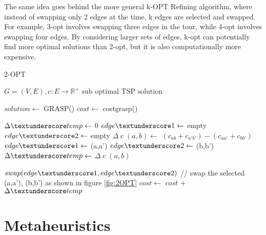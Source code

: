 The same idea goes behind the more general k-OPT Refining algorithm, where instead of swapping only 2 edges at the time, k edges are selected and swapped. For example, 3-opt involves swapping three edges in the tour, while 4-opt involves swapping four edges. By considering larger sets of edges, k-opt can potentially find more optimal solutions than 2-opt, but it is also computationally more expensive.
\begin{algorithm}[h!]
    \caption{2-OPT}\label{algo:2-OPT}
    \begin{algorithmic}[1]
    \Require $G = (V,E), c:E \to \mathbb{R}^+$
    \Ensure $\text{sub optimal TSP solution}$


    \State $solution \gets$ GRASP()
    \State $cost \gets$ cost\textunderscore grasp()
    

    \State $\Delta\textunderscore temp \gets$ 0
    \State $edge\textunderscore 1 \gets$ empty
    \State $edge\textunderscore 2 \gets$ empty
        \State $\Delta \operatorname{c}(a,b) \gets$  $(c_{ab} + c_{a'b'}) - (c_{aa'} + c_{bb'})$
        \State $edge\textunderscore 1 \gets$ (a,a')
        \State $edge\textunderscore 2 \gets$ (b,b')
        \State $\Delta\textunderscore temp \gets$ $\Delta \operatorname{c}(a,b)$
        \EndIf
        \EndFor
    \EndFor
    
    \State $swap(edge\textunderscore 1,edge\textunderscore 2) $ // swap the selected (a,a'), (b,b') as shown in figure \ref{fig:2OPT}
    \State $cost \gets  $ $cost$ + $\Delta\textunderscore temp$
    \EndIf
    

    \EndWhile

    \end{algorithmic}
\end{algorithm}



\section{Metaheuristics}
